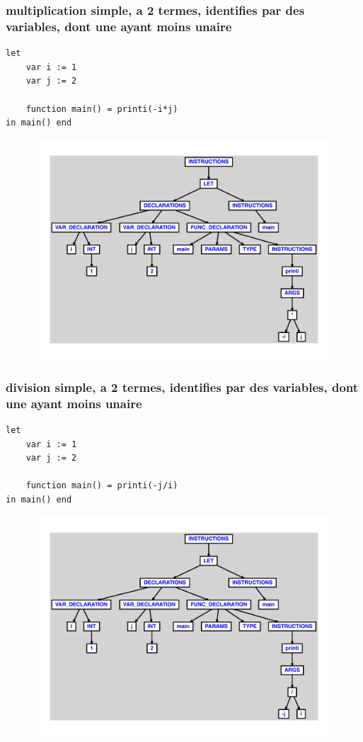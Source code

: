 \documentclass{article}
\begin{document}
\subsubsection{multiplication simple, a 2 termes, identifies par des variables, dont une ayant moins unaire}
\begin{lstlisting}
let
	var i := 1
	var j := 2

	function main() = printi(-i*j)
in main() end
\end{lstlisting}
\newpage
\begin{figure}[H]
\centering
\includegraphics[max width=\textwidth]{ast/ast_77.pdf}
\end{figure}
\newpage
\subsubsection{division simple, a 2 termes, identifies par des variables, dont une ayant moins unaire}
\begin{lstlisting}
let
	var i := 1
	var j := 2

	function main() = printi(-j/i)
in main() end
\end{lstlisting}
\newpage
\begin{figure}[H]
\centering
\includegraphics[max width=\textwidth]{ast/ast_78.pdf}
\end{figure}
\newpage
\end{document}
